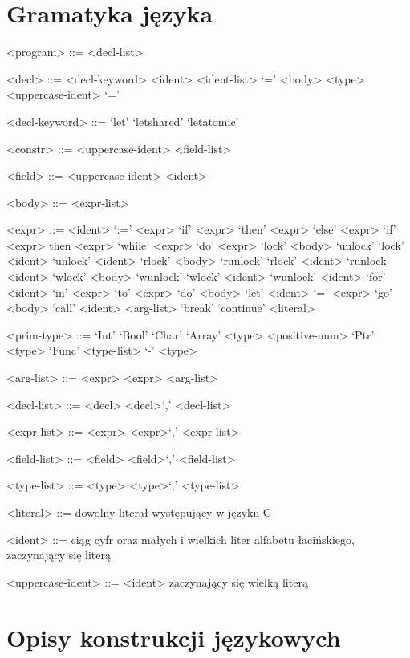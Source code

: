 \documentclass{documentation}
\begin{document}
\section{Gramatyka języka}
\begin{grammar}

<program> ::= <decl-list>

<decl> ::= <decl-keyword> <ident> <ident-list> `=' <body>
\alt <type> <uppercase-ident> `=' 

<decl-keyword> ::= `let'
\alt `letshared'
\alt `letatomic'

<constr> ::= <uppercase-ident> <field-list>

<field> ::= <uppercase-ident> <ident>

<body> ::= <expr-list>

<expr> ::= <ident> `:=' <expr>
\alt `if' <expr> `then' <expr> `else' <expr>
\alt `if' <expr> then <expr>
\alt `while' <expr> `do' <expr>
\alt `lock' <body> `unlock'
\alt `lock' <ident>
\alt `unlock' <ident>
\alt `rlock' <body> `runlock'
\alt `rlock' <ident>
\alt `runlock' <ident>
\alt `wlock' <body> `wunlock'
\alt `wlock' <ident>
\alt `wunlock' <ident>
\alt `for' <ident> `in' <expr> `to' <expr> `do' <body>
\alt `let' <ident> `=' <expr>
\alt `go' <body>
\alt `call' <ident> <arg-list>
\alt `break'
\alt `continue'
\alt <literal>

<prim-type> ::= `Int'
\alt `Bool'
\alt `Char'
\alt `Array' <type> <positive-num>
\alt `Ptr' <type>
\alt `Func' <type-list> `-\>' <type>

<arg-list> ::= <expr>
\alt <expr> <arg-list>

<decl-list> ::= <decl>
\alt <decl>`,' <decl-list>

<expr-list> ::= <expr>
\alt <expr>`,' <expr-list>

<field-list> ::= <field>
\alt <field>`,' <field-list>

<type-list> ::= <type>
\alt <type>`,' <type-list>

<literal> ::= dowolny literał występujący w języku C

<ident> ::= ciąg cyfr oraz małych i wielkich liter alfabetu łacińskiego, zaczynający się literą

<uppercase-ident> ::= <ident> zaczynający się wielką literą

\end{grammar}

\section{Opisy konstrukcji językowych}
\end{document}
